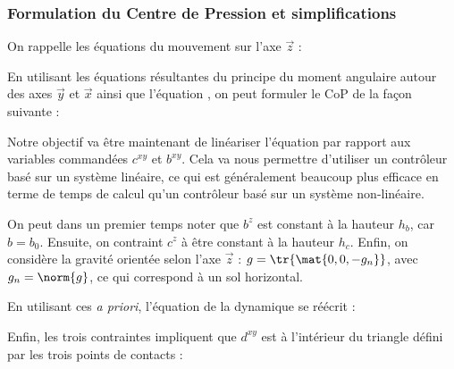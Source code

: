			\subsubsection{Formulation du Centre de Pression et simplifications}
			
				On rappelle les équations du mouvement sur l'axe $\vec{z}$  :
			
				En utilisant les équations résultantes du principe du moment angulaire autour des axes $\vec{y}$ et $\vec{x}$  ainsi que l'équation , on peut formuler le CoP de la façon suivante :	
				
				Notre objectif va être maintenant de linéariser l'équation  par rapport aux variables commandées $c^{xy}$ et $b^{xy}$.
				Cela va nous permettre d'utiliser un contrôleur basé sur un système linéaire, ce qui est généralement beaucoup plus efficace en terme de temps de calcul qu'un contrôleur basé sur un système non-linéaire.
				
				On peut dans un premier temps noter que $b^z$ est constant à la hauteur $h_b$, car $b=b_0$. Ensuite, on contraint $c^z$ à être constant à la hauteur $h_c$.
				Enfin, on considère la gravité orientée selon l'axe $\vec{z}$ : $g=\tr{\mat{0, 0, -g_n}}$, avec $g_n = \norm{g}$, ce qui correspond à un sol horizontal.
				
				En utilisant ces \textit{a priori}, l'équation de la dynamique  se réécrit :
				
				
				Enfin, les trois contraintes  impliquent que $d^{xy}$ est à l'intérieur du triangle défini par les trois points de contacts :
			
